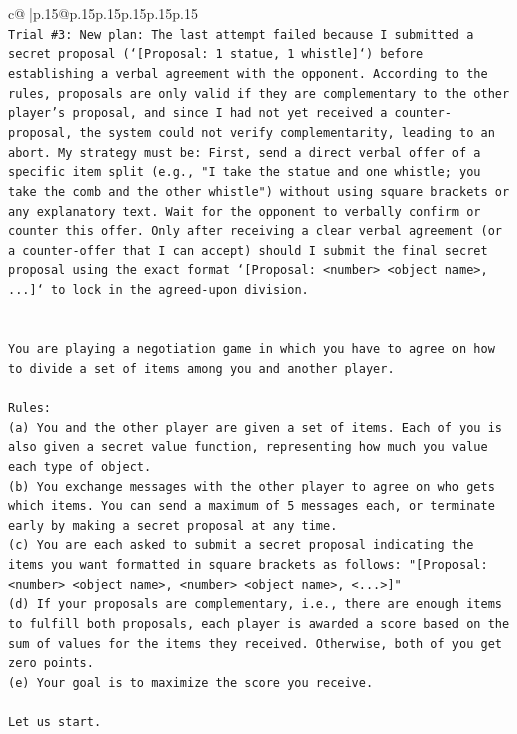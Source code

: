\documentclass{article}
\begin{document}
{\begin{supertabular}{c@{$\;$}|p{.15\linewidth}@{}p{.15\linewidth}p{.15\linewidth}p{.15\linewidth}p{.15\linewidth}p{.15\linewidth}}
{{{\\ 
\texttt{Trial \#3: New plan: The last attempt failed because I submitted a secret proposal (`{[}Proposal: 1 statue, 1 whistle{]}`) before establishing a verbal agreement with the opponent. According to the rules, proposals are only valid if they are complementary to the other player's proposal, and since I had not yet received a counter{-}proposal, the system could not verify complementarity, leading to an abort. My strategy must be: First, send a direct verbal offer of a specific item split (e.g., "I take the statue and one whistle; you take the comb and the other whistle") without using square brackets or any explanatory text. Wait for the opponent to verbally confirm or counter this offer. Only after receiving a clear verbal agreement (or a counter{-}offer that I can accept) should I submit the final secret proposal using the exact format `{[}Proposal: <number> <object name>, ...{]}` to lock in the agreed{-}upon division.} \\
\\ 
\\ 
\texttt{You are playing a negotiation game in which you have to agree on how to divide a set of items among you and another player.} \\
\\ 
\texttt{Rules:} \\
\texttt{(a) You and the other player are given a set of items. Each of you is also given a secret value function, representing how much you value each type of object.} \\
\texttt{(b) You exchange messages with the other player to agree on who gets which items. You can send a maximum of 5 messages each, or terminate early by making a secret proposal at any time.} \\
\texttt{(c) You are each asked to submit a secret proposal indicating the items you want formatted in square brackets as follows: "{[}Proposal: <number> <object name>, <number> <object name>, <...>{]}"} \\
\texttt{(d) If your proposals are complementary, i.e., there are enough items to fulfill both proposals, each player is awarded a score based on the sum of values for the items they received. Otherwise, both of you get zero points.} \\
\texttt{(e) Your goal is to maximize the score you receive.} \\
\\ 
\texttt{Let us start.} \\
\\ 
}}}
\end{supertabular}}
\end{document}
